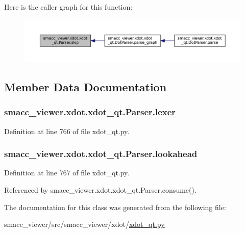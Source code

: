 Here is the caller graph for this function\+:
\nopagebreak
\begin{figure}[H]
\begin{center}
\leavevmode
\includegraphics[width=350pt]{classsmacc__viewer_1_1xdot_1_1xdot__qt_1_1Parser_a4e2f01d5c182da82a3e0d54e0e5b5143_icgraph}
\end{center}
\end{figure}




\subsection{Member Data Documentation}
\subsubsection[{\texorpdfstring{lexer}{lexer}}]{\setlength{\rightskip}{0pt plus 5cm}smacc\+\_\+viewer.\+xdot.\+xdot\+\_\+qt.\+Parser.\+lexer}\hypertarget{classsmacc__viewer_1_1xdot_1_1xdot__qt_1_1Parser_a849927c1fb4026f95914fd8e7b6d5065}{}\label{classsmacc__viewer_1_1xdot_1_1xdot__qt_1_1Parser_a849927c1fb4026f95914fd8e7b6d5065}


Definition at line 766 of file xdot\+\_\+qt.\+py.

\subsubsection[{\texorpdfstring{lookahead}{lookahead}}]{\setlength{\rightskip}{0pt plus 5cm}smacc\+\_\+viewer.\+xdot.\+xdot\+\_\+qt.\+Parser.\+lookahead}\hypertarget{classsmacc__viewer_1_1xdot_1_1xdot__qt_1_1Parser_a328364d5814b359473e2bf499fbeed85}{}\label{classsmacc__viewer_1_1xdot_1_1xdot__qt_1_1Parser_a328364d5814b359473e2bf499fbeed85}


Definition at line 767 of file xdot\+\_\+qt.\+py.



Referenced by smacc\+\_\+viewer.\+xdot.\+xdot\+\_\+qt.\+Parser.\+consume().



The documentation for this class was generated from the following file\+:\begin{DoxyCompactItemize}
\item 
smacc\+\_\+viewer/src/smacc\+\_\+viewer/xdot/\hyperlink{xdot__qt_8py}{xdot\+\_\+qt.\+py}\end{DoxyCompactItemize}
